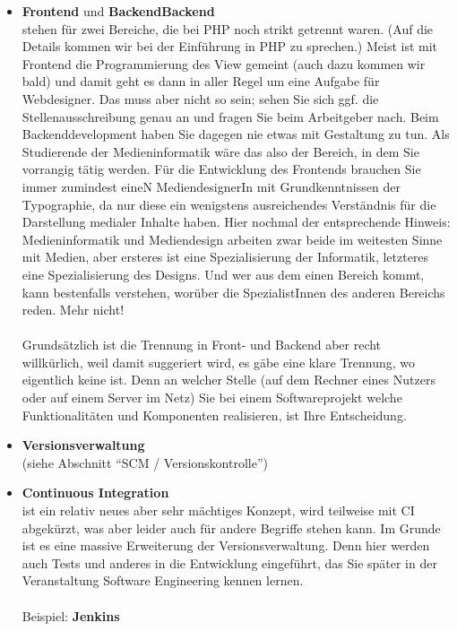 \begin{itemize}
	\item \textbf{Frontend} und \textbf{Backend}\textbf{Backend}\\
	stehen für zwei Bereiche, die bei PHP noch strikt getrennt waren. (Auf die Details kommen wir bei der Einführung in PHP zu sprechen.) Meist ist mit Frontend die Programmierung des View gemeint (auch dazu kommen wir bald) und damit geht es dann in aller Regel um eine Aufgabe für Webdesigner. Das muss aber nicht so sein; sehen Sie sich ggf. die Stellenausschreibung genau an und fragen Sie beim Arbeitgeber nach. Beim Backenddevelopment haben Sie dagegen nie etwas mit Gestaltung zu tun. Als Studierende der Medieninformatik wäre das also der Bereich, in dem Sie vorrangig tätig werden. Für die Entwicklung des Frontends brauchen Sie immer zumindest eineN MediendesignerIn mit Grundkenntnissen der Typographie, da nur diese ein wenigstens ausreichendes Verständnis für die Darstellung medialer Inhalte haben. Hier nochmal der entsprechende Hinweis: Medieninformatik und Mediendesign arbeiten zwar beide im weitesten Sinne mit Medien, aber ersteres ist eine Spezialisierung der Informatik, letzteres eine Spezialisierung des Designs. Und wer aus dem einen Bereich kommt, kann bestenfalls verstehen, worüber die SpezialistInnen des anderen Bereichs reden. Mehr nicht!\\
	\\
	Grundsätzlich ist die Trennung in Front- und Backend aber recht\\willkürlich, weil damit suggeriert wird, es gäbe eine klare Trennung, wo eigentlich keine ist. Denn an welcher Stelle (auf dem Rechner eines Nutzers oder auf einem Server im Netz) Sie bei einem Softwareprojekt welche Funktionalitäten und Komponenten realisieren, ist Ihre Entscheidung.

	\item \textbf{Versionsverwaltung}\\
	(siehe Abschnitt "`SCM / Versionskontrolle"')

	\item \textbf{Continuous Integration}\\
	ist ein relativ neues aber sehr mächtiges Konzept, wird teilweise mit CI abgekürzt, was aber leider auch für andere Begriffe stehen kann. Im Grunde ist es eine massive Erweiterung der Versionsverwaltung. Denn hier werden auch Tests und anderes in die Entwicklung eingeführt, das Sie später in der Veranstaltung Software Engineering kennen lernen.\\
	\\
	Beispiel: \textbf{Jenkins}


\end{itemize}
